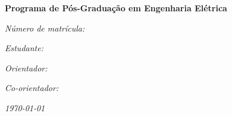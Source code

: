 \begin{center}
\textbf{\large{}Programa de Pós-Graduação em Engenharia Elétrica}
\par\end{center}{\large \par}

\vspace{6cm}


\begin{center}
{\LARGE{}\reporttitle}
\par\end{center}{\LARGE \par}

\vfill{}


\textit{\emph{\large{}Número de matrícula: \registrationnumber}}{\large \par}

\textit{\emph{\large{}Estudante: \studentname}}{\large \par}

\textit{\emph{\large{}Orientador: \advisorname}}{\large \par}

\textit{\emph{\large{}Co-orientador: \coadvisorname}}{\large \par}

\vspace{1cm}


\begin{flushright}
\textit{\emph{\today}}
\par\end{flushright}

\pagebreak{}
